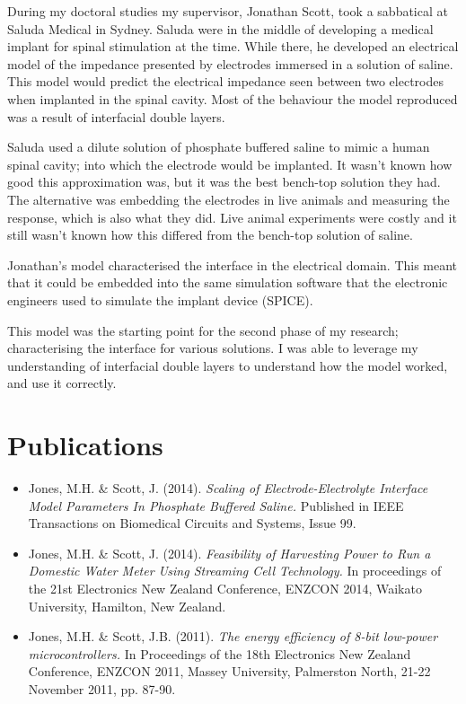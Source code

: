   During my doctoral studies my supervisor, Jonathan Scott, took a sabbatical at Saluda Medical in Sydney.
  Saluda were in the middle of developing a medical implant for spinal stimulation at the time.
  While there, he developed an electrical model of the impedance presented by electrodes immersed in a solution of saline.
  This model would predict the electrical impedance seen between two electrodes when implanted in the spinal cavity.
  Most of the behaviour the model reproduced was a result of interfacial double layers.

  Saluda used a dilute solution of phosphate buffered saline to mimic a human spinal cavity; into which the electrode would be implanted.
  It wasn't known how good this approximation was, but it was the best bench-top solution they had.
  The alternative was embedding the electrodes in live animals and measuring the response, which is also what they did.
  Live animal experiments were costly and it still wasn't known how this differed from the bench-top solution of saline.

  Jonathan's model characterised the interface in the electrical domain.
  This meant that it could be embedded into the same simulation software that the electronic engineers used to simulate the implant device (SPICE).

  This model was the starting point for the second phase of my research; characterising the interface for various solutions.
  I was able to leverage my understanding of interfacial double layers to understand how the model worked, and use it correctly.

\section{Publications}

  \begin{itemize}
    \item Jones, M.H. \& Scott, J. (2014). \emph{Scaling of Electrode-Electrolyte Interface Model Parameters In Phosphate Buffered Saline.} Published in IEEE Transactions on Biomedical Circuits and Systems, Issue 99.
    \item Jones, M.H. \& Scott, J. (2014). \emph{Feasibility of Harvesting Power to Run a Domestic Water Meter Using Streaming Cell Technology.} In proceedings of the 21st Electronics New Zealand Conference, ENZCON 2014, Waikato University, Hamilton, New Zealand.
    \item Jones, M.H. \& Scott, J.B. (2011). \emph{The energy efficiency of 8-bit low-power microcontrollers.} In Proceedings of the 18th Electronics New Zealand Conference, ENZCON 2011, Massey University, Palmerston North, 21-22 November 2011, pp. 87-90.
  \end{itemize}

